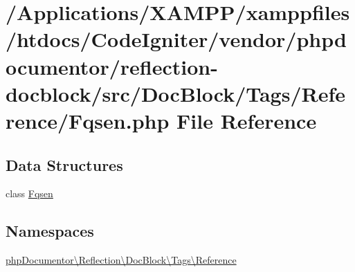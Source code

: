 \hypertarget{reflection-docblock_2src_2_doc_block_2_tags_2_reference_2_fqsen_8php}{}\section{/\+Applications/\+X\+A\+M\+P\+P/xamppfiles/htdocs/\+Code\+Igniter/vendor/phpdocumentor/reflection-\/docblock/src/\+Doc\+Block/\+Tags/\+Reference/\+Fqsen.php File Reference}
\label{reflection-docblock_2src_2_doc_block_2_tags_2_reference_2_fqsen_8php}
\subsection*{Data Structures}
\begin{DoxyCompactItemize}
\item 
class \mbox{\hyperlink{classphp_documentor_1_1_reflection_1_1_doc_block_1_1_tags_1_1_reference_1_1_fqsen}{Fqsen}}
\end{DoxyCompactItemize}
\subsection*{Namespaces}
\begin{DoxyCompactItemize}
\item 
 \mbox{\hyperlink{namespacephp_documentor_1_1_reflection_1_1_doc_block_1_1_tags_1_1_reference}{php\+Documentor\textbackslash{}\+Reflection\textbackslash{}\+Doc\+Block\textbackslash{}\+Tags\textbackslash{}\+Reference}}
\end{DoxyCompactItemize}

